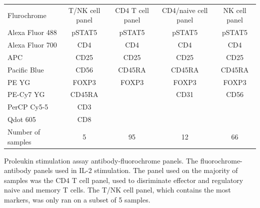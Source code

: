 \begin{table}[h!]\footnotesize
  \centering
\begin{tabularx}{\textwidth}{lcccc}
\rowcolor{Gray}
Flurochrome       & T/NK cell panel & CD4 T cell panel & CD4/naive cell panel & NK cell panel \\
Alexa Fluor 488   & pSTAT5          & pSTAT5           & pSTAT5               & pSTAT5  \\
Alexa Fluor 700   & CD4             & CD4              & CD4                  & CD4     \\
APC               & CD25            & CD25             & CD25                 & CD25    \\
Pacific Blue      & CD56            & CD45RA           & CD45RA               & CD45RA  \\
PE YG             & FOXP3           & FOXP3            & FOXP3                & FOXP3   \\
PE-Cy7 YG         & CD45RA          &                  & CD31                 & CD56    \\
PerCP Cy5-5       & CD3             &                  &                      & \\
Qdot 605          & CD8             &                  &                      & \\
\hline
Number of samples &  5              & 95               & 12                   & 66 \\
\end{tabularx}
{Proleukin stimulation assay antibody-fluorochrome panels.}
{
The fluorochrome-antibody panels used in IL-2 stimulation.
The panel used on the majority of samples was the CD4 T cell panel, used to disriminate
effector and regulatory naive and memory T cells.
The T/NK cell panel, which contains the most markers, was only ran on a subset of 5 samples.
}
\end{table}
%

